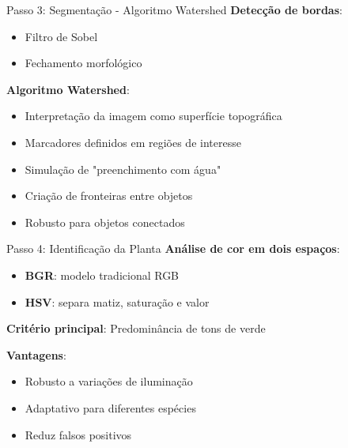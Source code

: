 \documentclass[landscape, 12pt]{beamer}
\begin{document}
\begin{frame}{Passo 3: Segmentação - Algoritmo Watershed}
    \textbf{Detecção de bordas}:
    \begin{itemize}
        \item Filtro de Sobel
        \item Fechamento morfológico
    \end{itemize}
    
    \vspace{0.5cm}
    \textbf{Algoritmo Watershed}:
    \begin{itemize}
        \item Interpretação da imagem como superfície topográfica
        \item Marcadores definidos em regiões de interesse
        \item Simulação de "preenchimento com água"
        \item Criação de fronteiras entre objetos
        \item Robusto para objetos conectados
    \end{itemize}
\end{frame}

\begin{frame}{Passo 4: Identificação da Planta}
    \textbf{Análise de cor em dois espaços}:
    \begin{itemize}
        \item \textbf{BGR}: modelo tradicional RGB
        \item \textbf{HSV}: separa matiz, saturação e valor
    \end{itemize}
    
    \vspace{0.5cm}
    \textbf{Critério principal}: Predominância de tons de verde
    
    \vspace{0.5cm}
    \textbf{Vantagens}:
    \begin{itemize}
        \item Robusto a variações de iluminação
        \item Adaptativo para diferentes espécies
        \item Reduz falsos positivos
    \end{itemize}
\end{frame}
\end{document}
